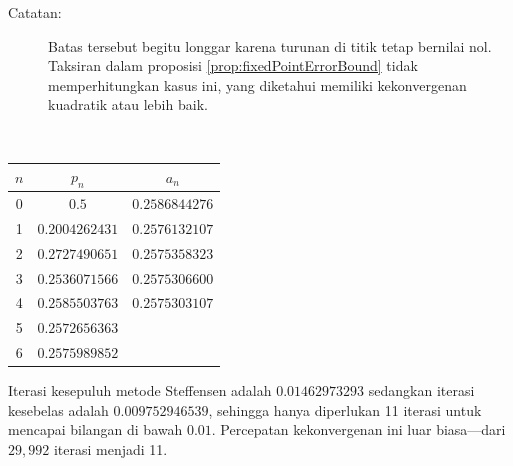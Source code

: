 \begin{description}
\begin{description}
\begin{description}
\item [{Catatan:}] Batas tersebut begitu longgar karena turunan di titik
tetap bernilai nol. Taksiran dalam proposisi \ref{prop:fixedPointErrorBound}
tidak memperhitungkan kasus ini, yang diketahui memiliki kekonvergenan
kuadratik atau lebih baik.
\end{description}
\end{description}
\item [{\ref{exc:orderOfConvergence-6}:}]~

\begin{center}
\begin{tabular}{c|cc}
$n$ & $p_{n}$ & $a_{n}$\tabularnewline
\hline 
0 & $0.5$ & $0.2586844276$\tabularnewline
1 & $0.2004262431$ & $0.2576132107$\tabularnewline
2 & $0.2727490651$ & $0.2575358323$\tabularnewline
3 & $0.2536071566$ & $0.2575306600$\tabularnewline
4 & $0.2585503763$ & $0.2575303107$\tabularnewline
5 & $0.2572656363$ & \tabularnewline
6 & $0.2575989852$ & \tabularnewline
\end{tabular}
\par\end{center}
\item [{\ref{exc:orderOfConvergence-8}:}] Iterasi kesepuluh metode Steffensen
adalah $0.01462973293$ sedangkan iterasi kesebelas adalah $0.009752946539$,
sehingga hanya diperlukan 11 iterasi untuk mencapai bilangan di bawah
$0.01$. Percepatan kekonvergenan ini luar biasa---dari $29,992$
iterasi menjadi 11. 
\end{description}

